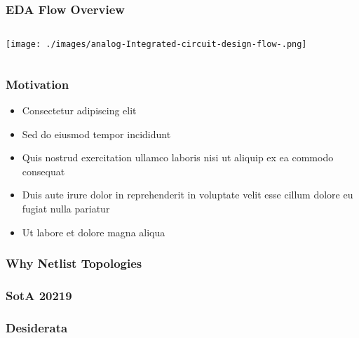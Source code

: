 \documentclass[./presentation.tex]{subfiles}
\begin{document}
\begin{frame}
\frametitle{EDA Flow Overview}
  \begin{columns}
    \begin{column}{0.5\textwidth}
      \texttt{[image: ./images/analog-Integrated-circuit-design-flow-.png]} 
    \end{column}
    \begin{column}{0.5\textwidth}
      
    \end{column}
  \end{columns}
\end{frame}

\begin{frame}
\frametitle{Motivation}
\begin{itemize}
\item Consectetur adipiscing elit
\item Sed do eiusmod tempor incididunt
\item Quis nostrud exercitation ullamco laboris nisi ut aliquip ex ea commodo consequat
\item Duis aute irure dolor in reprehenderit in voluptate velit esse cillum dolore eu fugiat nulla pariatur
\item Ut labore et dolore magna aliqua
\end{itemize}
\end{frame}

\begin{frame}
\frametitle{Why Netlist Topologies}
\end{frame}

\begin{frame}
\frametitle{SotA 20219}

\end{frame}

\begin{frame}
\frametitle{Desiderata}

\end{frame}
  
\end{document}
